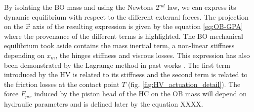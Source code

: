 \documentclass[3p,twocolumn,preprint]{elsarticle}
\begin{document}
By isolating the BO mass and using the Newtons 2$^{nd}$ law, we can express its dynamic equilibrium with respect to the different external forces. The projection on the $\vec{x}$ axis of the resulting expression is given by the equation \ref{eq:OB-GPA} where the provenance of the different terms is highlighted. The BO mechanical equilibrium took aside contains the mass inertial term, a non-linear stiffness depending on $x_m$, the hinges stiffness and viscous losses. This expression has also been demonstrated by the Lagrange method in past works \cite{Liu2013}. The first term introduced by the HV is related to its stiffness and the second term is related to the friction losses at the contact point $T$ (fig. \ref{fig:HV_actuation_detail}). The force $F_{pis}$ induced by the piston head of the HC on the OB mass will depend on hydraulic parameters and is defined later by the equation XXXX.
\end{document}

